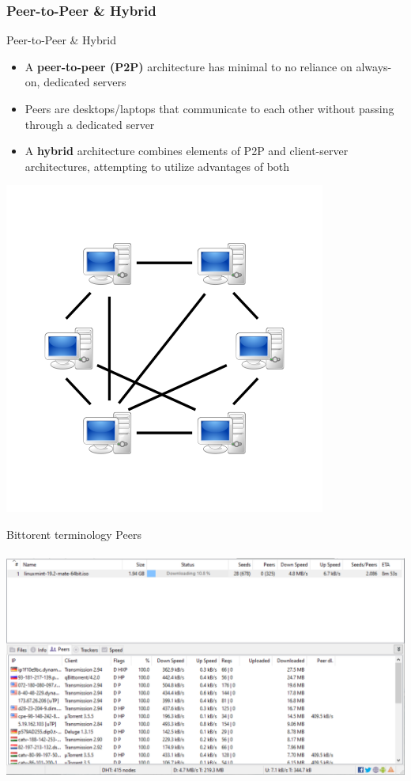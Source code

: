 \documentclass{beamer}
\begin{document}
        \subsubsection{Peer-to-Peer \& Hybrid}
        \begin{frame}{Peer-to-Peer \& Hybrid}
            \begin{itemize}
                \item A \textbf{peer-to-peer (P2P)} architecture has minimal to no reliance on always-on, dedicated servers
                \item Peers are desktops/laptops that communicate to each other without passing through a dedicated server
                \item A \textbf{hybrid} architecture combines elements of P2P and client-server architectures, attempting to utilize advantages of both
            \end{itemize}
            \centering
            \includegraphics[scale=0.5]{P2P-network.png}
        \end{frame}
        
        \begin{frame}{Bittorent terminology}
            Peers \\ \\ 
             \centering
            \includegraphics[scale=0.5]{bit-2.PNG}
        \end{frame}
        
\end{document}
